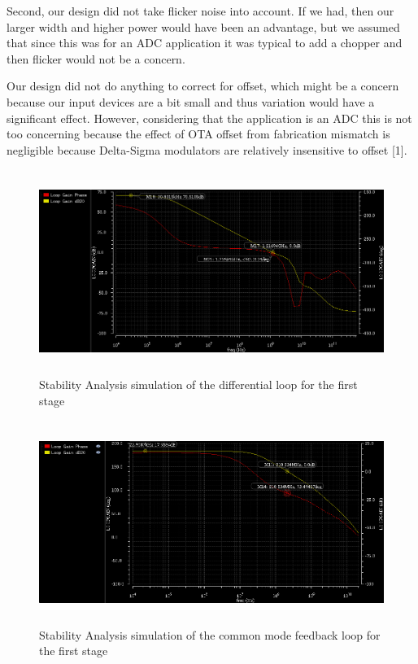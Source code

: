 \documentclass[conference]{IEEEtran}
\begin{document}
Second, our design did not take flicker noise into account. If we had, then our larger width and higher power would have been an advantage, but we assumed that since this was for an ADC application it was typical to add a chopper and then flicker would not be a concern.

Our design did not do anything to correct for offset, which might be a concern because our input devices are a bit small and thus variation would have a significant effect. However, considering that the application is an ADC this is not too concerning because the effect of OTA offset from fabrication mismatch is negligible because Delta-Sigma modulators are relatively insensitive to offset [1].





\begin{figure}[H]
\centering
\includegraphics[height=250px]{piktures/st1_diff_ac}
\caption{Stability Analysis simulation of the differential loop for the first stage}
\label{fig:st1_diff_ac}
\end{figure}

\begin{figure}[H]
\centering
\includegraphics[height=250px]{piktures/st1_cm_ac}
\caption{Stability Analysis simulation of the common mode feedback loop for the first stage}
\label{fig:st1_cm_ac}
\end{figure}
\end{document}
